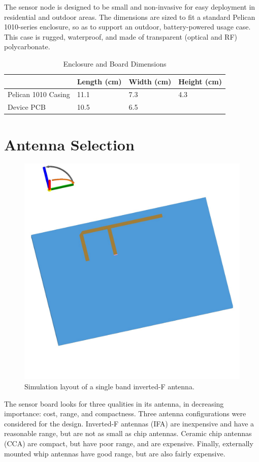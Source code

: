The sensor node is designed to be small and non-invasive for easy deployment in residential and outdoor areas. The dimensions are sized to fit a standard Pelican 1010-series enclosure, so as to support an outdoor, battery-powered usage case. This case is rugged, waterproof, and made of transparent (optical and RF) polycarbonate.

\begin{table}[h]
\begin{tabular}{@{}l|lll@{}}
                    & Length (cm) & Width (cm) & Height (cm) \\ \midrule
Pelican 1010 Casing & 11.1        & 7.3        & 4.3         \\
Device PCB          & 10.5        & 6.5        &            
\end{tabular}
\caption{Enclosure and Board Dimensions}
\label{dimensions}
\end{table}

\section{Antenna Selection}

\begin{figure}[h]
\centering
\includegraphics[width=0.5\linewidth]{images/antenna-sketch}
\caption[IFA Layout]{Simulation layout of a single band inverted-F antenna.}
\label{fig:pifa}
\end{figure}

The sensor board looks for three qualities in its antenna, in decreasing importance: cost, range, and compactness. Three antenna configurations were considered for the design. Inverted-F antennas (IFA) are inexpensive and have a reasonable range, but are not as small as chip antennas. Ceramic chip antennas (CCA) are compact, but have poor range, and are expensive. Finally, externally mounted whip antennas have good range, but are also fairly expensive.

